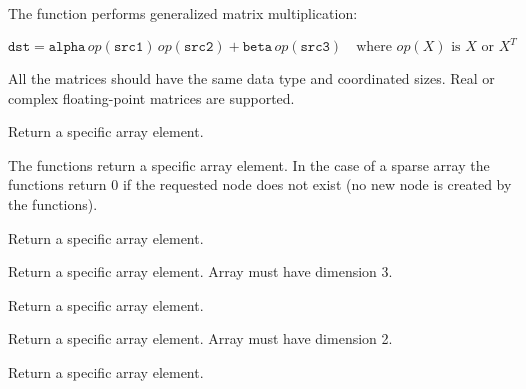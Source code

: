 The function performs generalized matrix multiplication:

\[
\texttt{dst} = \texttt{alpha} \, op(\texttt{src1}) \, op(\texttt{src2}) + \texttt{beta} \, op(\texttt{src3}) \quad \text{where $op(X)$ is $X$ or $X^T$}
\]

All the matrices should have the same data type and coordinated sizes. Real or complex floating-point matrices are supported.

\ifC  %

Return a specific array element.


\begin{description}
\end{description}

The functions return a specific array element. In the case of a sparse array the functions return 0 if the requested node does not exist (no new node is created by the functions).
\else %

Return a specific array element.


\begin{description}
\end{description}

Return a specific array element.  Array must have dimension 3.

Return a specific array element.


\begin{description}
\end{description}

Return a specific array element.  Array must have dimension 2.

Return a specific array element.

